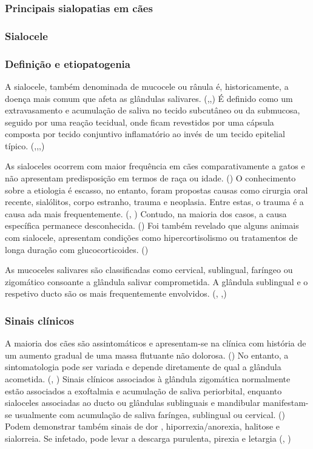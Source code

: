 \subsubsection{Principais sialopatias em cães}
\subsubsection{Sialocele}
\subsubsection{Definição e etiopatogenia}

A sialocele, também denominada de mucocele ou rânula é, historicamente, a doença  mais comum que afeta as glândulas salivares. (\cite{deLaPuerta2020},\cite{Cinti2021},\cite{Olimpo2023}) É definido como um extravasamento e acumulação de saliva no tecido subcutâneo ou da submucosa, seguido por uma reação tecidual, onde ficam revestidos por uma cápsula composta por tecido conjuntivo inflamatório ao invés de um tecido epitelial típico. (\cite{Zadeh2025},\cite{rfeu},\cite{Bae2024},\cite{sa_})


As sialoceles ocorrem com maior frequência em cães comparativamente a gatos e não apresentam predisposição em termos de raça ou idade. (\cite{Bae2024}) O conhecimento sobre a etiologia é escasso, no entanto, foram propostas causas como cirurgia oral recente, sialólitos, corpo estranho, trauma e neoplasia. Entre estas, o trauma é a causa \cite{Kumar2017}ada mais frequentemente. (\cite{deLaPuerta2020}, \cite{Olimpo2023}) Contudo, na maioria dos casos, a causa específica permanece desconhecida. ({\cite{Cinti2021}}) Foi também revelado que alguns animais com sialocele, apresentam condições como hipercortisolismo ou tratamentos de longa duração com glucocorticoides. (\cite{Bae2024}) 


As mucoceles salivares são classificadas como cervical, sublingual, faríngeo ou zigomático consoante a glândula salivar comprometida. A glândula sublingual e o respetivo ducto são os mais frequentemente envolvidos. (\cite{Poirier2018}, \cite{Cinti2021},\cite{sa_})

\subsubsection{Sinais clínicos}

A maioria dos cães são assintomáticos e apresentam-se na clínica com história de um aumento gradual de uma massa flutuante não dolorosa. (\cite{Poirier2018}) No entanto, a sintomatologia pode ser variada e depende diretamente de qual a glândula acometida. (\cite{deLaPuerta2020}, \cite{sa_}) Sinais clínicos associados à glândula zigomática normalmente estão associados a exoftalmia e acumulação de saliva periorbital, enquanto sialoceles associadas  ao ducto ou glândulas sublinguais e mandibular manifestam-se usualmente com acumulação de saliva faríngea, sublingual ou cervical. (\cite{sa_}) Podem demonstrar também sinais de dor , hiporrexia/anorexia, halitose e sialorreia.  Se infetado, pode levar a descarga purulenta, pirexia e letargia (\cite{sa_}, \cite{Swieton2022})

